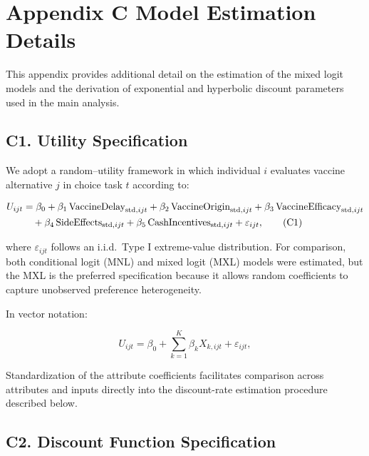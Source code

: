 
\section*{Appendix C Model Estimation Details}
\label{app:C}
\doublespacing

This appendix provides additional detail on the estimation of the mixed logit models and the
derivation of exponential and hyperbolic discount parameters used in the main analysis.

\subsection*{C1. Utility Specification}

We adopt a random–utility framework in which individual $i$ evaluates vaccine alternative $j$
in choice task $t$ according to:

\begin{align}
U_{ijt} &= \beta_0
+ \beta_1\,\text{VaccineDelay}_{\text{std},ijt}
+ \beta_2\,\text{VaccineOrigin}_{\text{std},ijt}
+ \beta_3\,\text{VaccineEfficacy}_{\text{std},ijt} \notag\\
&\quad + \beta_4\,\text{SideEffects}_{\text{std},ijt}
+ \beta_5\,\text{CashIncentives}_{\text{std},ijt}
+ \varepsilon_{ijt}, \tag{C1}
\end{align}

where $\varepsilon_{ijt}$ follows an i.i.d.\ Type I extreme-value distribution.  
For comparison, both conditional logit (MNL) and mixed logit (MXL) models were estimated,
but the MXL is the preferred specification because it allows random coefficients to capture
unobserved preference heterogeneity.

In vector notation:

\begin{equation}
U_{ijt}
= \beta_0
+ \sum_{k=1}^{K} \beta_k X_{k,ijt}
+ \varepsilon_{ijt},
\tag{C2}
\end{equation}

Standardization of the attribute coefficients facilitates comparison across attributes and inputs
directly into the discount-rate estimation procedure described below.

\subsection*{C2. Discount Function Specification}

